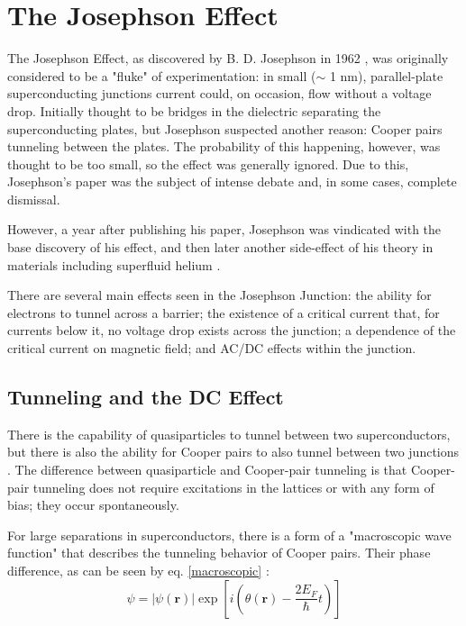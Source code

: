 \documentclass[letterpaper,english,reprint, aps]{revtex4}
\begin{document}
\section{The Josephson Effect}
The Josephson Effect, as discovered by B. D. Josephson in 1962 \citep{josephson, josephson_ieee}, was originally considered to be a "fluke" of experimentation: in small ($\sim$ 1 nm), parallel-plate superconducting junctions current could, on occasion, flow without a voltage drop. Initially thought to be bridges in the dielectric separating the superconducting plates, but Josephson suspected another reason: Cooper pairs tunneling between the plates. The probability of this happening, however, was thought to be too small, so the effect was generally ignored. Due to this, Josephson's paper was the subject of intense debate and, in some cases, complete dismissal.

However, a year after publishing his paper, Josephson was vindicated with the base discovery of his effect, and then later another side-effect of his theory in materials including superfluid helium \citep{josephson_ieee, probable_jj, AC_He_jj, AC_detect}.

There are several main effects seen in the Josephson Junction: the ability for electrons to tunnel across a barrier; the existence of a critical current that, for currents below it, no voltage drop exists across the junction; a dependence of the critical current on magnetic field; and AC/DC effects within the junction.

\subsection{Tunneling and the DC Effect}
There is the capability of quasiparticles to tunnel between two superconductors, but there is also the ability for Cooper pairs to also tunnel between two junctions \citep{josephson, vanduzer}. The difference between quasiparticle and Cooper-pair tunneling is that Cooper-pair tunneling does not require excitations in the lattices or with any form of bias; they occur spontaneously.

For large separations in superconductors, there is a form of a "macroscopic wave function" that describes the tunneling behavior of Cooper pairs. Their phase difference, as can be seen by eq. \ref{macroscopic} \citep{vanduzer}:
\begin{equation}
    \label{macroscopic}
    \psi = |\psi (\boldsymbol{r})|\exp\left[i\left(\theta(\boldsymbol{r}) - \frac{2E_F}{\hbar}t\right)\right]
\end{equation}
\end{document}
